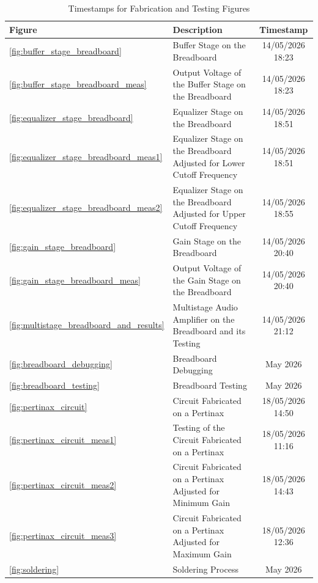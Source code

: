 \documentclass[12pt, a4paper]{article}
\numberwithin{table}{section}
\numberwithin{figure}{section}
\begin{document}
\begin{table}[H]
\centering
\caption{Timestamps for Fabrication and Testing Figures}
\label{tab:fabrication_timestamps}
\renewcommand{\arraystretch}{1.2}
\begin{tabularx}{\textwidth}{|l|X|c|}
\hline
\textbf{Figure} & \textbf{Description} & \textbf{Timestamp} \\ \hline
\ref{fig:buffer_stage_breadboard} & Buffer Stage on the Breadboard & 14/05/2026 18:23 \\ \hline
\ref{fig:buffer_stage_breadboard_meas} & Output Voltage of the Buffer Stage on the Breadboard & 14/05/2026 18:23 \\ \hline
\ref{fig:equalizer_stage_breadboard} & Equalizer Stage on the Breadboard & 14/05/2026 18:51 \\ \hline
\ref{fig:equalizer_stage_breadboard_meas1} & Equalizer Stage on the Breadboard Adjusted for Lower Cutoff Frequency & 14/05/2026 18:51 \\ \hline
\ref{fig:equalizer_stage_breadboard_meas2} & Equalizer Stage on the Breadboard Adjusted for Upper Cutoff Frequency & 14/05/2026 18:55 \\ \hline
\ref{fig:gain_stage_breadboard} & Gain Stage on the Breadboard & 14/05/2026 20:40 \\ \hline
\ref{fig:gain_stage_breadboard_meas} & Output Voltage of the Gain Stage on the Breadboard & 14/05/2026 20:40 \\ \hline
\ref{fig:multistage_breadboard_and_results} & Multistage Audio Amplifier on the Breadboard and its Testing & 14/05/2026 21:12 \\ \hline
\ref{fig:breadboard_debugging} & Breadboard Debugging & May 2026 \\ \hline
\ref{fig:breadboard_testing} & Breadboard Testing & May 2026 \\ \hline
\ref{fig:pertinax_circuit} & Circuit Fabricated on a Pertinax & 18/05/2026 14:50 \\ \hline
\ref{fig:pertinax_circuit_meas1} & Testing of the Circuit Fabricated on a Pertinax & 18/05/2026 11:16 \\ \hline
\ref{fig:pertinax_circuit_meas2} & Circuit Fabricated on a Pertinax Adjusted for Minimum Gain & 18/05/2026 14:43 \\ \hline
\ref{fig:pertinax_circuit_meas3} & Circuit Fabricated on a Pertinax Adjusted for Maximum Gain & 18/05/2026 12:36 \\ \hline
\ref{fig:soldering} & Soldering Process & May 2026 \\ \hline
\end{tabularx}
\end{table}

\newpage

\listoftables
\listoffigures
\end{document}
